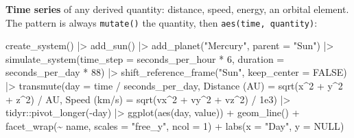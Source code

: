 \documentclass[
  10.5pt,
  letterpaper,
]{scrbook}
\newenvironment{Shaded}{\begin{snugshade}}{\end{snugshade}}
\newcommand{\AttributeTok}[1]{\textcolor[rgb]{0.00,0.00,0.00}{#1}}
\newcommand{\ConstantTok}[1]{\textcolor[rgb]{0.00,0.00,0.00}{#1}}
\newcommand{\DecValTok}[1]{\textcolor[rgb]{0.00,0.00,0.00}{#1}}
\newcommand{\FloatTok}[1]{\textcolor[rgb]{0.00,0.00,0.00}{#1}}
\newcommand{\FunctionTok}[1]{\textcolor[rgb]{0.00,0.00,0.00}{#1}}
\newcommand{\NormalTok}[1]{\textcolor[rgb]{0.00,0.00,0.00}{#1}}
\newcommand{\OtherTok}[1]{\textcolor[rgb]{0.00,0.00,0.00}{#1}}
\newcommand{\SpecialCharTok}[1]{\textcolor[rgb]{0.00,0.00,0.00}{#1}}
\newcommand{\StringTok}[1]{\textcolor[rgb]{0.00,0.00,0.00}{#1}}
\theoremstyle{plain}
\theoremstyle{remark}
\begin{document}
\textbf{Time series} of any derived quantity: distance, speed, energy,
an orbital element. The pattern is always \texttt{mutate()} the
quantity, then \texttt{aes(time,\ quantity)}:

\begin{Shaded}
\begin{Highlighting}[]
\FunctionTok{create\_system}\NormalTok{() }\SpecialCharTok{|\textgreater{}}
  \FunctionTok{add\_sun}\NormalTok{() }\SpecialCharTok{|\textgreater{}}
  \FunctionTok{add\_planet}\NormalTok{(}\StringTok{"Mercury"}\NormalTok{, }\AttributeTok{parent =} \StringTok{"Sun"}\NormalTok{) }\SpecialCharTok{|\textgreater{}}
  \FunctionTok{simulate\_system}\NormalTok{(}\AttributeTok{time\_step =}\NormalTok{ seconds\_per\_hour }\SpecialCharTok{*} \DecValTok{6}\NormalTok{, }\AttributeTok{duration =}\NormalTok{ seconds\_per\_day }\SpecialCharTok{*} \DecValTok{88}\NormalTok{) }\SpecialCharTok{|\textgreater{}}
  \FunctionTok{shift\_reference\_frame}\NormalTok{(}\StringTok{"Sun"}\NormalTok{, }\AttributeTok{keep\_center =} \ConstantTok{FALSE}\NormalTok{) }\SpecialCharTok{|\textgreater{}}
  \FunctionTok{transmute}\NormalTok{(}\AttributeTok{day =}\NormalTok{ time }\SpecialCharTok{/}\NormalTok{ seconds\_per\_day,}
            \StringTok{\textasciigrave{}}\AttributeTok{Distance (AU)}\StringTok{\textasciigrave{}} \OtherTok{=} \FunctionTok{sqrt}\NormalTok{(x}\SpecialCharTok{\^{}}\DecValTok{2} \SpecialCharTok{+}\NormalTok{ y}\SpecialCharTok{\^{}}\DecValTok{2} \SpecialCharTok{+}\NormalTok{ z}\SpecialCharTok{\^{}}\DecValTok{2}\NormalTok{) }\SpecialCharTok{/}\NormalTok{ AU,}
            \StringTok{\textasciigrave{}}\AttributeTok{Speed (km/s)}\StringTok{\textasciigrave{}}  \OtherTok{=} \FunctionTok{sqrt}\NormalTok{(vx}\SpecialCharTok{\^{}}\DecValTok{2} \SpecialCharTok{+}\NormalTok{ vy}\SpecialCharTok{\^{}}\DecValTok{2} \SpecialCharTok{+}\NormalTok{ vz}\SpecialCharTok{\^{}}\DecValTok{2}\NormalTok{) }\SpecialCharTok{/} \FloatTok{1e3}\NormalTok{) }\SpecialCharTok{|\textgreater{}}
\NormalTok{  tidyr}\SpecialCharTok{::}\FunctionTok{pivot\_longer}\NormalTok{(}\SpecialCharTok{{-}}\NormalTok{day) }\SpecialCharTok{|\textgreater{}}
  \FunctionTok{ggplot}\NormalTok{(}\FunctionTok{aes}\NormalTok{(day, value)) }\SpecialCharTok{+}
  \FunctionTok{geom\_line}\NormalTok{() }\SpecialCharTok{+}
  \FunctionTok{facet\_wrap}\NormalTok{(}\SpecialCharTok{\textasciitilde{}}\NormalTok{ name, }\AttributeTok{scales =} \StringTok{"free\_y"}\NormalTok{, }\AttributeTok{ncol =} \DecValTok{1}\NormalTok{) }\SpecialCharTok{+}
  \FunctionTok{labs}\NormalTok{(}\AttributeTok{x =} \StringTok{"Day"}\NormalTok{, }\AttributeTok{y =} \ConstantTok{NULL}\NormalTok{)}
\end{Highlighting}
\end{Shaded}
\end{document}
